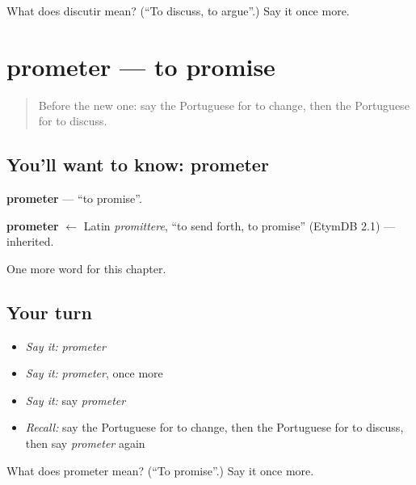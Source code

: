 \begin{tcolorbox}[breakable,colback=teal!4,colframe=teal!35!black,title={Before you move on}]
What does discutir mean? (\textquotedblleft{}To discuss, to argue\textquotedblright{}.) Say it once more.
\end{tcolorbox}
\section[prometer]{prometer — to promise}

\label{lesson:PT-C140-prometer}



\begin{quote}
Before the new one: say the Portuguese for to change, then the Portuguese for to discuss.
\end{quote}

\subsection*{You'll want to know: prometer}
\textbf{prometer} — \textquotedblleft{}to promise\textquotedblright{}.

\begin{cousinweb}
\textbf{prometer} $\leftarrow$ Latin \emph{promittere}, \textquotedblleft{}to send forth, to promise\textquotedblright{} (EtymDB 2.1) — inherited.
\end{cousinweb}

\begin{grammarlens}[title={What you've built}]
One more word for this chapter.
\end{grammarlens}

\subsection*{Your turn}
\begin{itemize}
\raggedright
  \item \emph{Say it:} \emph{prometer}
  \item \emph{Say it:} \emph{prometer}, once more
  \item \emph{Say it:} say \emph{prometer}
  \item \emph{Recall:} say the Portuguese for to change, then the Portuguese for to discuss, then say \emph{prometer} again
\end{itemize}

\begin{tcolorbox}[breakable,colback=teal!4,colframe=teal!35!black,title={Before you move on}]
What does prometer mean? (\textquotedblleft{}To promise\textquotedblright{}.) Say it once more.
\end{tcolorbox}
